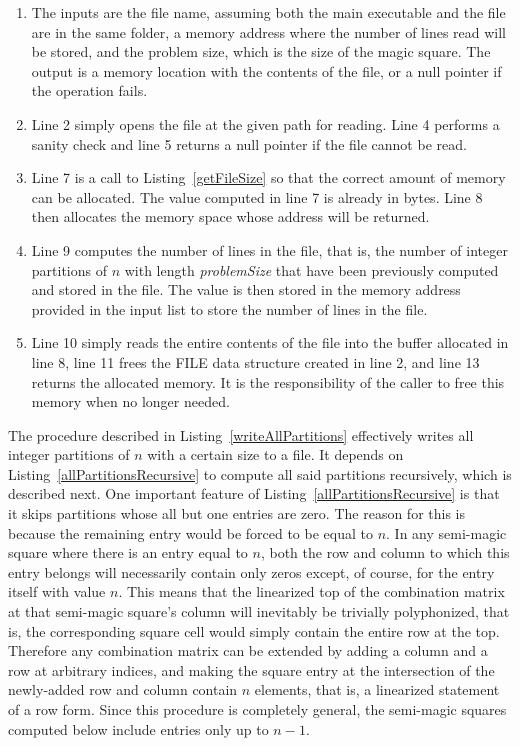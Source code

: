 \begin{enumerate}
\item The inputs are the file name, assuming both the main executable and the file are in the same folder, a memory address where the number of lines read will be stored, and the problem size, which is the size of the magic square. The output is a memory location with the contents of the file, or a null pointer if the operation fails.
\item Line 2 simply opens the file at the given path for reading. Line 4 performs a sanity check and line 5 returns a null pointer if the file cannot be read.
\addtocounter{enumi}{4}
\item Line 7 is a call to Listing~\ref{getFileSize} so that the correct amount of memory can be allocated. The value computed in line 7 is already in bytes. Line 8 then allocates the memory space whose address will be returned.
\addtocounter{enumi}{1}
\item Line 9 computes the number of lines in the file, that is, the number of integer partitions of $n$ with length \emph{problemSize} that have been previously computed and stored in the file. The value is then stored in the memory address provided in the input list to store the number of lines in the file.
\item Line 10 simply reads the entire contents of the file into the buffer allocated in line 8, line 11 frees the FILE data structure created in line 2, and line 13 returns the allocated memory. It is the responsibility of the caller to free this memory when no longer needed.
\end{enumerate}

The procedure described in Listing~\ref{writeAllPartitions} effectively writes all integer partitions of $n$ with a certain size to a file. It depends on Listing~\ref{allPartitionsRecursive} to compute all said partitions recursively, which is described next. One important feature of Listing~\ref{allPartitionsRecursive} is that it skips partitions whose all but one entries are zero. The reason for this is because the remaining entry would be forced to be equal to $n$. In any semi-magic square where there is an entry equal to $n$, both the row and column to which this entry belongs will necessarily contain only zeros except, of course, for the entry itself with value $n$. This means that the linearized top of the combination matrix at that semi-magic square's column will inevitably be trivially polyphonized, that is, the corresponding square cell would simply contain the entire row at the top. Therefore any combination matrix can be extended by adding a column and a row at arbitrary indices, and making the square entry at the intersection of the newly-added row and column contain $n$ elements, that is, a linearized statement of a row form. Since this procedure is completely general, the semi-magic squares computed below include entries only up to $n - 1$.

